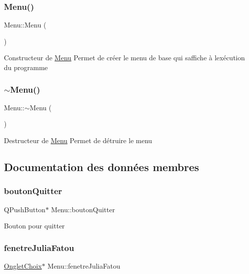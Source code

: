 \subsubsection{\texorpdfstring{Menu()}{Menu()}}
{\footnotesize\ttfamily Menu\+::\+Menu (\begin{DoxyParamCaption}{ }\end{DoxyParamCaption})}

Constructeur de \hyperlink{classMenu}{Menu} Permet de créer le menu de base qui s\textquotesingle{}affiche à l\textquotesingle{}exécution du programme \mbox{\label{classMenu_a831387f51358cfb88cd018e1777bc980}} 
\subsubsection{\texorpdfstring{$\sim$\+Menu()}{~Menu()}}
{\footnotesize\ttfamily Menu\+::$\sim$\+Menu (\begin{DoxyParamCaption}{ }\end{DoxyParamCaption})}

Destructeur de \hyperlink{classMenu}{Menu} Permet de détruire le menu 

\subsection{Documentation des données membres}
\mbox{\label{classMenu_a71e7ddf2318b3199bb724f96ade1dbc2}} 
\subsubsection{\texorpdfstring{bouton\+Quitter}{boutonQuitter}}
{\footnotesize\ttfamily Q\+Push\+Button$\ast$ Menu\+::bouton\+Quitter\hspace{0.3cm}{\ttfamily [private]}}

Bouton pour quitter \mbox{\label{classMenu_aedcc1cdce0b64f787d05e2625b488211}} 
\subsubsection{\texorpdfstring{fenetre\+Julia\+Fatou}{fenetreJuliaFatou}}
{\footnotesize\ttfamily \hyperlink{classOngletChoix}{Onglet\+Choix}$\ast$ Menu\+::fenetre\+Julia\+Fatou\hspace{0.3cm}{\ttfamily [private]}}

